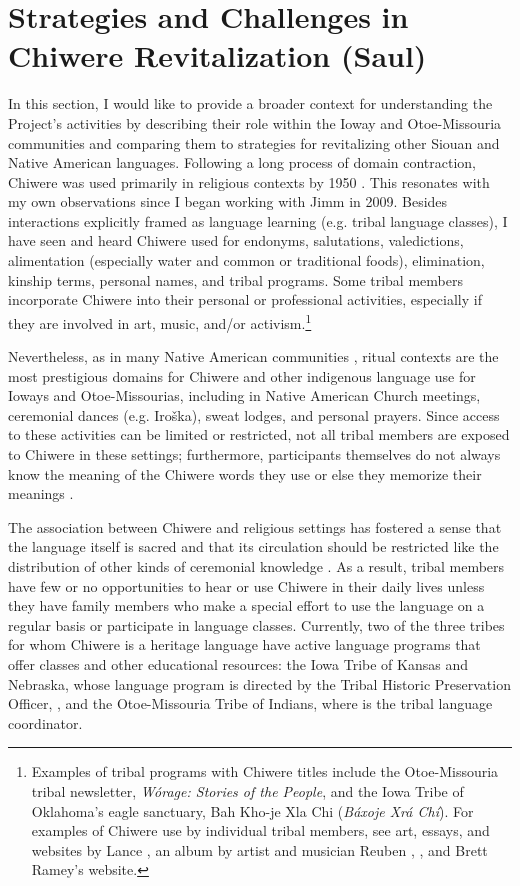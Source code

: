 \documentclass[output=paper]{LSP/langsci}
\begin{document}
\section{Strategies and Challenges in Chiwere Revitalization (Saul)}\label{saul}
In this section, I would like to provide a broader context for understanding the Project's activities by describing their role within the Ioway and Otoe-Missouria communities and comparing them to strategies for revitalizing other Siouan and Native American languages. Following a long process of domain contraction, Chiwere was used primarily in religious contexts by 1950 \citep{Davidson1997, FurbeeStanley1996, FurbeeStanley2002}. This resonates with my own observations since I began working with Jimm in 2009. Besides interactions explicitly framed as language learning (e.g. tribal language classes), I have seen and heard Chiwere used for endonyms, salutations, valedictions, alimentation (especially water and common or traditional foods), elimination, kinship terms, personal names, and tribal programs. Some tribal members incorporate Chiwere into their personal or professional activities, especially if they are involved in art, music, and/or activism.\footnote{Examples of tribal programs with Chiwere titles include the Otoe-Missouria tribal newsletter, \emph{Wórage: Stories of the People}, and the Iowa Tribe of Oklahoma's eagle sanctuary, Bah Kho-je Xla Chi (\emph{Báxoje Xrá Chí}). For examples of Chiwere use by individual tribal members, see art, essays, and websites by Lance \citet{Foster1989, Foster1996, Foster1999, Foster2009, FosterNDa, FosterNDb, FosterNDc}, an album by artist and musician Reuben \citet{Kent2004}, \citet{Jones2004}, and Brett Ramey's \citeyearpar{RameyND} website.} 

Nevertheless, as in many Native American communities \citep[see e.g.][]{Kroskrity1998}, ritual contexts are the most prestigious domains for Chiwere and other indigenous language use for Ioways and Otoe-Missourias, including in Native American Church meetings, ceremonial dances (e.g. Iroška), sweat lodges, and personal prayers. Since access to these activities can be limited or restricted, not all tribal members are exposed to Chiwere in these settings; furthermore, participants themselves do not always know the meaning of the Chiwere words they use or else they memorize their meanings \citep[see e.g.][520--521]{Davidson1997}.

The association between Chiwere and religious settings has fostered a sense that the language itself is sacred and that its circulation should be restricted like the distribution of other kinds of ceremonial knowledge \citep{Davidson1997}. As a result, tribal members have few or no opportunities to hear or use Chiwere in their daily lives unless they have family members who make a special effort to use the language on a regular basis or participate in language classes. Currently, two of the three tribes for whom Chiwere is a heritage language have active language programs that offer classes and other educational resources: the Iowa Tribe of Kansas and Nebraska, whose language program is directed by the Tribal Historic Preservation Officer, , and the Otoe-Missouria Tribe of Indians, where  is the tribal language coordinator.
\end{document}
